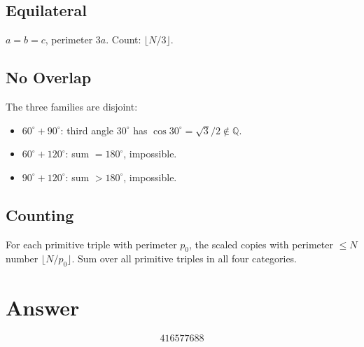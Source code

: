 \documentclass[12pt]{article}
\begin{document}
\subsection{Equilateral}
$a = b = c$, perimeter $3a$. Count: $\lfloor N/3 \rfloor$.

\subsection{No Overlap}
The three families are disjoint:
\begin{itemize}
\item $60^\circ + 90^\circ$: third angle $30^\circ$ has $\cos 30^\circ = \sqrt{3}/2 \notin \mathbb{Q}$.
\item $60^\circ + 120^\circ$: sum $= 180^\circ$, impossible.
\item $90^\circ + 120^\circ$: sum $> 180^\circ$, impossible.
\end{itemize}

\subsection{Counting}
For each primitive triple with perimeter $p_0$, the scaled copies with perimeter $\le N$ number $\lfloor N/p_0 \rfloor$. Sum over all primitive triples in all four categories.

\section{Answer}

\[
\boxed{416577688}
\]
\end{document}
